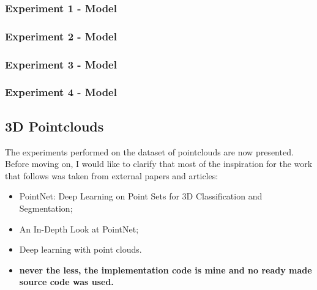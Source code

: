 \documentclass[11pt,a4paper]{article}
\begin{document}
\subsubsection{Experiment 1 - Model}
\subsubsection{Experiment 2 - Model}
\subsubsection{Experiment 3 - Model}
\subsubsection{Experiment 4 - Model}
\subsection{3D Pointclouds}
The experiments performed on the dataset of pointclouds are now presented. Before moving on, I would like to clarify that most of the inspiration for the work that follows was taken from external papers and articles:
\begin{itemize}
    \item PointNet: Deep Learning on Point Sets for 3D Classification and Segmentation\cite{qi2017pointnet};
    \item An In-Depth Look at PointNet\cite{mediumcompointnet};
    \item Deep learning with point clouds\cite{romainthalineaupointclouds}.
    \item \textbf{never the less, the implementation code is mine and no ready made source code was used.}
\end{itemize}
\end{document}
